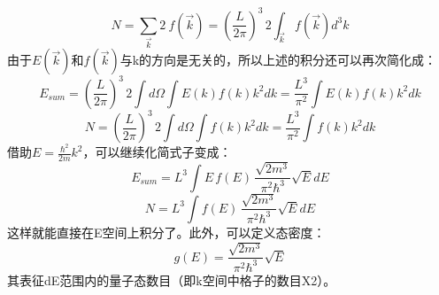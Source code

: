\begin{equation}
N=\textstyle \sum_{\vec{k}}2\ f(\vec{k})=(\frac{L}{2\pi})^3\,2 \int_{\vec{k}}f(\vec{k})d^3k
\end{equation}
由于$E(\vec{k})$和$f(\vec{k})$与k的方向是无关的，所以上述的积分还可以再次简化成：
\begin{equation}
E_{sum}=(\frac{L}{2\pi})^3\,2\int d\Omega \int E(k)f(k)k^2dk=\frac{L^3}{\pi^2} \int E(k)f(k)k^2dk
\end{equation}
\begin{equation}
N=(\frac{L}{2\pi})^3\,2\int d\Omega \int f(k)k^2dk=\frac{L^3}{\pi^2}\int f(k)k^2dk
\end{equation}
借助$E=\frac{\hbar^2}{2m}k^2$，可以继续化简式子变成：
\begin{equation}
E_{sum}=L^3 \int E\,f(E)\,\frac{\sqrt{2m^3}}{\pi^2\hbar^3}\sqrt{E}dE
\end{equation}
\begin{equation}
N=L^3 \int f(E)\,\frac{\sqrt{2m^3}}{\pi^2\hbar^3}\sqrt{E}dE
\end{equation}
这样就能直接在E空间上积分了。此外，可以定义态密度：
\begin{equation}
g(E)=\frac{\sqrt{2m^3}}{\pi^2\hbar^3}\sqrt{E}
\end{equation}
其表征dE范围内的量子态数目（即k空间中格子的数目X2）。